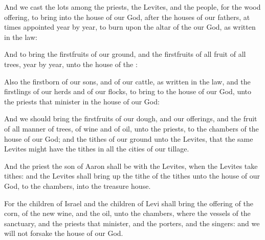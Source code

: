 {And we
cast the
lots among the
priests, the
Levites, and the
people, for the
wood
offering, to
bring
{} into the
house of our
God, after the
houses of our
fathers, at
times
appointed
year by
year, to
burn upon the
altar of the
{} our
God, as
{}
written in the
law:

And to
bring the
firstfruits of our
ground, and the
firstfruits of all
fruit of all
trees,
year by
year, unto the
house of the
{}:

Also the
firstborn of our
sons, and of our
cattle, as
{}
written in the
law, and the
firstlings of our
herds and of our
flocks, to
bring to the
house of our
God, unto the
priests that
minister in the
house of our
God:

And
{} we should
bring the
firstfruits of our
dough, and our
offerings, and the
fruit of all manner of
trees, of
wine and of
oil, unto the
priests, to the
chambers of the
house of our
God; and the
tithes of our
ground unto the
Levites, that the same
Levites might have the
tithes in all the
cities of our
tillage.

And the
priest the
son of
Aaron shall be with the
Levites, when the
Levites take
tithes: and the
Levites shall bring
up the
tithe of the
tithes unto the
house of our
God, to the
chambers, into the
treasure
house.

For the
children of
Israel and the
children of
Levi shall
bring the
offering of the
corn, of the new
wine, and the
oil, unto the
chambers, where
{} the
vessels of the
sanctuary, and the
priests that
minister, and the
porters, and the
singers: and we will not
forsake the
house of our
God.




\par }
